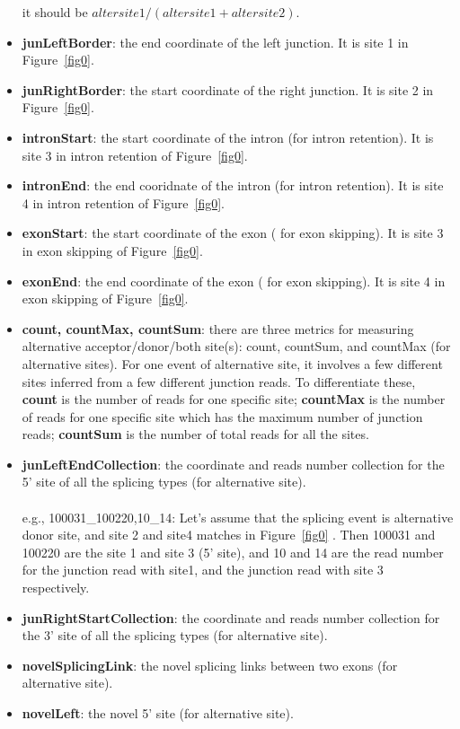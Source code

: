 \documentclass[a4paper]{article}
\begin{document}
\begin{itemize}
it should be $altersite1/(altersite1+altersite2)$.
\item \textbf{junLeftBorder}: the end coordinate of the left junction. It is site 1 in Figure~\ref{fig0}.
\item \textbf{junRightBorder}: the start coordinate of the right junction. It is site 2 in Figure~\ref{fig0}.
\item \textbf{intronStart}: the start coordinate of the intron (for intron retention). It is site 3 in intron retention of Figure~\ref{fig0}.
\item \textbf{intronEnd}: the end cooridnate of the intron (for intron retention). It is site 4 in intron retention of Figure~\ref{fig0}. 
\item \textbf{exonStart}: the start coordinate of the exon ( for exon skipping). It is site 3 in exon skipping of Figure~\ref{fig0}.
\item \textbf{exonEnd}: the end coordinate of the exon ( for exon skipping). It is site 4 in exon skipping of Figure~\ref{fig0}.
\item \textbf{count, countMax, countSum}: there are three metrics for measuring  
  alternative acceptor/donor/both site(s): count, countSum, and countMax (for alternative sites). 
  For one event of alternative site, it involves a few different sites 
  inferred from a few different junction reads. To differentiate these, 
  \textbf{count} is the number of reads for one specific site; 
  \textbf{countMax} is the number of reads for one specific site which has the 
  maximum number of junction reads; \textbf{countSum} is the number of total 
  reads for all the sites.   
\item \textbf{junLeftEndCollection}: the coordinate and reads number collection for the 5' site of all the splicing types (for alternative site).
\\ \\
  e.g., 100031\_100220,10\_14: Let's assume that the splicing event is alternative donor site, and site 2 and site4 matches in Figure~\ref{fig0} . Then 100031 and 100220 are the site 1 and site 3 (5' site), and 10 and 14 are the read number for the junction read with site1, and the junction read with site 3 respectively.
\item \textbf{junRightStartCollection}: the coordinate and reads number collection for the 3' site of all the splicing types (for alternative site).
\item \textbf{novelSplicingLink}: the novel splicing links between two exons (for alternative site).
\item \textbf{novelLeft}: the novel 5' site (for alternative site).

\end{itemize}
\end{document}
